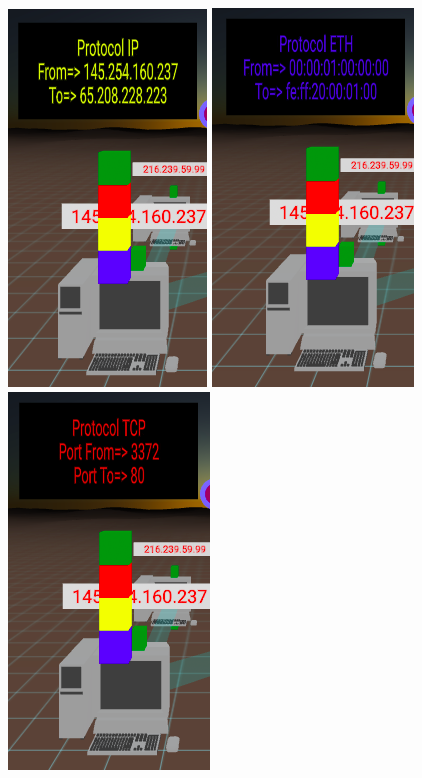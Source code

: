 \documentclass[a4paper, 12pt]{book}
\begin{document}
\begin{figure}[h]
\centering
    \includegraphics[scale=0.45]{img/capa_ip.png}
    \includegraphics[scale=0.45]{img/capa_eth.png}
    \includegraphics[scale=0.45]{img/capa_tcp.png}

\end{figure}
\end{document}
